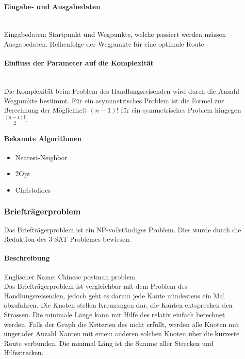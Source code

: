 	\paragraph{Eingabe- und Ausgabedaten}\mbox{}\\
	Eingabedaten: Startpunkt und Wegpunkte, welche passiert werden müssen\\
	Ausgabedaten: Reihenfolge der Wegpunkte für eine optimale Route

	\paragraph{Einfluss der Parameter auf die Komplexität}\mbox{}\\
	Die Komplexität beim Problem des Handlungsreisenden wird durch die Anzahl Wegpunkte bestimmt. Für ein asymmetrisches Problem ist die Formel zur Berechnung der Möglichkeit $(n-1)!$ 
	für ein symmetrisches Problem hingegen $\frac{(n-1)!}{2}$.
	
	 \newpage
	\paragraph{Bekannte Algorithmen}\cite{tsp_algorithmen} \cite{tsp_semesterarbeit}
	\begin{itemize}
		\item Nearest-Neighbor
		\item 2Opt
		\item Christofides
	\end{itemize}

	\subsubsection{Briefträgerproblem}\label{chinese_postman}
	Das Briefträgerproblem ist ein NP-vollständiges Problem. Dies wurde durch die Reduktion des 3-SAT Problemes bewiesen.

	\paragraph{Beschreibung}
	Englischer Name: Chinese postman problem\\
	Das Briefträgerproblem ist vergleichbar mit dem Problem des Handlungsreisenden, jedoch geht es darum jede Kante mindestens ein Mal abzufahren. Die Knoten stellen Kreuzungen dar, die 
	Kanten entsprechen den Strassen. Die minimale Länge kann mit Hilfe des  relativ einfach berechnet werden. Falls der Graph die Kriterien des 
	 nicht erfüllt, werden alle Knoten mit ungerader Anzahl Kanten mit einem anderen solchen Knoten über die kürzeste Route verbunden. 
	Die minimal Läng ist die Summe aller Strecken und Hilfsstrecken.
	\cite{pearson2004decision}

